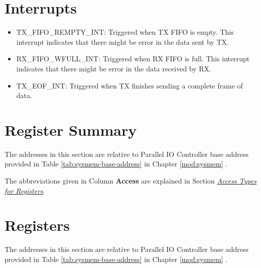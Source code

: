 \documentclass[main\_\_EN.tex]{subfiles}
\begin{document}
\section{Interrupts} \label{sec:parlio-interrupts}

\begin{itemize}
\item \label{int:TXFIFOREMPTYINT}TX\_FIFO\_REMPTY\_INT: Triggered when TX FIFO is empty. This interrupt indicates that there might be error in the data sent by TX.
\item \label{int:RXFIFOWFULLINT}RX\_FIFO\_WFULL\_INT: Triggered when RX FIFO is full. This interrupt indicates that there might be error in the data received by RX.
\item \label{int:TXEOFINT}TX\_EOF\_INT: Triggered when TX finishes sending a complete frame of data.
\end{itemize}






\clearpage
\hypertarget{parlio-reg-summ}{}
\section{Register Summary}
\label{sec:parlio-reg-summ}

The addresses in this section are relative to Parallel IO Controller base address provided in Table \ref{tab:sysmem-base-address} in Chapter \ref{mod:sysmem} \textit{}.

The abbreviations given in Column \textbf{Access} are explained in Section \hyperref[glossary-access-types]{\textit{Access Types for Registers}}.






\clearpage
\section{Registers}

The addresses in this section are relative to Parallel IO Controller base address provided in Table \ref{tab:sysmem-base-address} in Chapter \ref{mod:sysmem} \textit{}.


\end{document}
